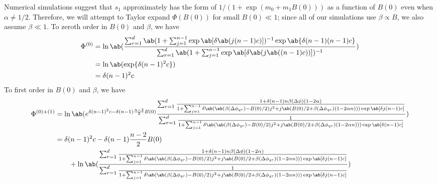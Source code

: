 Numerical simulations suggest that $s_1$ approximately has the form of
$1/(1+\exp(m_0 + m_1 B(0)))$ as a function of $B(0)$ even when $\alpha
\neq 1/2$.
Therefore, we will attempt to Taylor expand $\Phi(B(0))$ for small
$B(0) \ll 1$; since all of our simulations use $\beta \propto B$, we also
assume $\beta \ll 1$.
To zeroth order in $B(0)$ and $\beta$, we have
\begin{equation}
  \begin{aligned}
    \Phi^{(0)} &= \ln\ab(
\frac{\sum_{r=1}^{d}
\ab(1+\sum_{j=1}^{n-1} \exp\ab[\delta \ab( j (n-1) c)])^{-1}
                \exp \ab\{ \delta (n-1) (n-1) c \}
               }
{\sum_{r=1}^{d}
\ab(1+\sum_{j=1}^{n-1} \exp\ab[\delta \ab( j \ab((n-1) c))])^{-1} }
  ) \\
  &= \ln\ab( \exp\{ \delta (n-1)^2 c \}) \\
  &= \delta (n-1)^2 c
  \end{aligned}
\end{equation}
To first order in $B(0)$ and $\beta$, we have
\begin{equation}
  \begin{aligned}
    \Phi^{(0)+(1)} &= \ln\ab(
  e^{\delta(n-1)^2 c - \delta (n-1) \frac{n-2}{2} B(0)}
\frac{\sum_{r=1}^{d}
  \frac{1 + \delta (n-1) n \beta(\Delta\phi) (1 - 2 \alpha)
    }{1+\sum_{j=1}^{n-1} \delta \ab(
           \ab(\beta(\Delta\phi_{qr}) - B(0)/2) j^2
           + j \ab(B(0)/2 + \beta(\Delta\phi_{qr}) (1 - 2 \alpha n)))
           \exp\ab[\delta j (n-1) c]
         }
                               }
{\sum_{r=1}^{d}
  \frac{1}{1+\sum_{j=1}^{n-1} \delta \ab(
           \ab(\beta(\Delta\phi_{qr}) - B(0)/2) j^2
           + j \ab(B(0)/2 + \beta(\Delta\phi_{qr}) (1 - 2 \alpha n)))
           \exp\ab[\delta (n-1) c]
         }
                  }
  )
  \\
  &=
\delta(n-1)^2 c - \delta (n-1) \frac{n-2}{2} B(0) \\
  &\qquad +
\ln\ab(
\frac{\sum_{r=1}^{d}
  \frac{1 + \delta (n-1) n \beta(\Delta\phi) (1 - 2 \alpha)
    }{1+\sum_{j=1}^{n-1} \delta \ab(
           \ab(\beta(\Delta\phi_{qr}) - B(0)/2) j^2
           + j \ab(B(0)/2 + \beta(\Delta\phi_{qr}) (1 - 2 \alpha n)))
           \exp\ab[\delta j (n-1) c]
         }
                               }
{\sum_{r=1}^{d}
  \frac{1}{1+\sum_{j=1}^{n-1} \delta \ab(
           \ab(\beta(\Delta\phi_{qr}) - B(0)/2) j^2
           + j \ab(B(0)/2 + \beta(\Delta\phi_{qr}) (1 - 2 \alpha n)))
           \exp\ab[\delta j (n-1) c]
         }
                  }
  )
  \end{aligned}
  \label{eq:phase_first-order_big-frac}
\end{equation}

